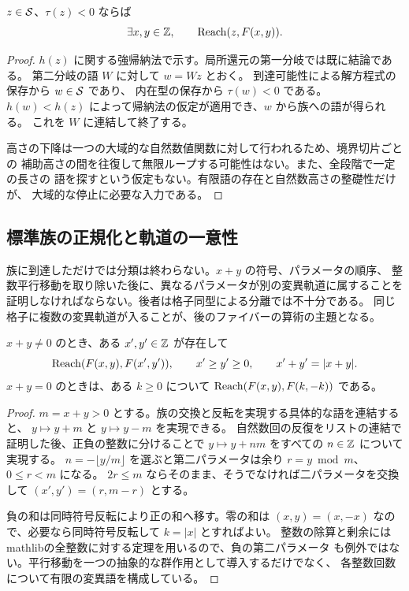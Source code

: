 \begin{theorem}[負側全解の族への到達]
\label{bp:neg-existence}
\leanok
\(z\in\mathcal S\)、\(\tau(z)<0\) ならば
\[
 \exists x,y\in\mathbb Z,\qquad\operatorname{Reach}(z,F(x,y)).
\]
\end{theorem}
\begin{proof}
\leanok
\(h(z)\) に関する強帰納法で示す。局所還元の第一分岐では既に結論である。
第二分岐の語 \(W\) に対して \(w=Wz\) とおく。
到達可能性による解方程式の保存から \(w\in\mathcal S\) であり、
内在型の保存から \(\tau(w)<0\) である。
\(h(w)<h(z)\) によって帰納法の仮定が適用でき、\(w\) から族への語が得られる。
これを \(W\) に連結して終了する。

高さの下降は一つの大域的な自然数値関数に対して行われるため、境界切片ごとの
補助高さの間を往復して無限ループする可能性はない。また、全段階で一定の長さの
語を探すという仮定もない。有限語の存在と自然数高さの整礎性だけが、
大域的な停止に必要な入力である。
\end{proof}

\subsection{標準族の正規化と軌道の一意性}

族に到達しただけでは分類は終わらない。\(x+y\) の符号、パラメータの順序、
整数平行移動を取り除いた後に、異なるパラメータが別の変異軌道に属することを
証明しなければならない。後者は格子同型による分離では不十分である。
同じ格子に複数の変異軌道が入ることが、後のファイバーの算術の主題となる。

\begin{theorem}[任意の整数族パラメータの正規化]
\label{bp:family-normalize}
\leanok
\(x+y\ne0\) のとき、ある \(x',y'\in\mathbb Z\) が存在して
\[
 \operatorname{Reach}(F(x,y),F(x',y')),\qquad
 x'\ge y'\ge0,\qquad x'+y'=|x+y|.
\]
\(x+y=0\) のときは、ある \(k\ge0\) について
\(\operatorname{Reach}(F(x,y),F(k,-k))\) である。
\end{theorem}
\begin{proof}
\leanok
\(m=x+y>0\) とする。族の交換と反転を実現する具体的な語を連結すると、
\(y\mapsto y+m\) と \(y\mapsto y-m\) を実現できる。
自然数回の反復をリストの連結で証明した後、正負の整数に分けることで
\(y\mapsto y+nm\) をすべての \(n\in\mathbb Z\) について実現する。
\(n=-\lfloor y/m\rfloor\) を選ぶと第二パラメータは余り
\(r=y\bmod m\)、\(0\le r<m\) になる。
\(2r\le m\) ならそのまま、そうでなければ二パラメータを交換して
\((x',y')=(r,m-r)\) とする。

負の和は同時符号反転により正の和へ移す。零の和は
\((x,y)=(x,-x)\) なので、必要なら同時符号反転して \(k=|x|\) とすればよい。
整数の除算と剰余にはmathlibの全整数に対する定理を用いるので、負の第二パラメータ
も例外ではない。平行移動を一つの抽象的な群作用として導入するだけでなく、
各整数回数について有限の変異語を構成している。
\end{proof}

